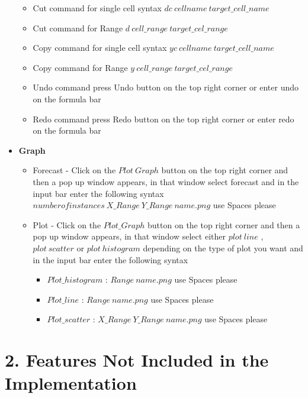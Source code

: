 \documentclass{article}
\begin{document}
\begin{itemize}
    \begin{itemize}
        \item Cut command for single cell syntax $dc\ cellname \ target\_cell\_name$
        \item Cut command for Range $d \ cell\_range\ target\_cel\_range$
        \item Copy command for single cell syntax $yc\ cellname \ target\_cell\_name$
        \item Copy command for Range $y \ cell\_range\ target\_cel\_range$
        \item Undo command press Undo button on the top right corner or enter undo on the formula bar
        \item Redo command press Redo button on the top right corner or enter redo on the formula bar
    \end{itemize}
         \item \textbf{Graph}
    \begin{itemize}
        \item Forecast - Click on the $Plot\ Graph$ button on the top right corner and then a pop up window appears, in that window select forecast and in the input bar enter the following syntax $numberofinstances\ X\_Range\ Y\_Range\ name.png$ {use Spaces please}
         \item Plot - Click on the $Plot\_Graph$ button on the top right corner and then a pop up window appears, in that window select either $plot\ line$ ,$plot\ scatter$ or $plot\ histogram$ depending on the type of plot you want and in the input bar enter the following syntax 
         \begin{itemize}
         \item $Plot\_histogram$ : $Range\ name.png$ {use Spaces please}
         \item $Plot\_line$ : $Range\ name.png$ {use Spaces please}
         \item $Plot\_scatter$ : $X\_Range\ Y\_Range\ name.png$ {use Spaces please}
         \end{itemize}
    \end{itemize}

    
    
\end{itemize}

\section*{2. Features Not Included in the Implementation}
\end{document}

